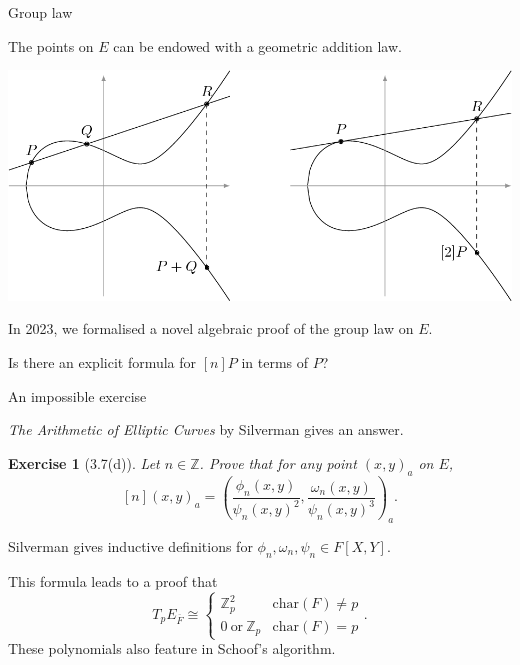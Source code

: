 \documentclass[10pt]{beamer}
\newtheorem{exercise}{Exercise}
\begin{document}
\begin{frame}[t]{Group law}

The points on $ E $ can be endowed with a geometric addition law.

\begin{center}
\includegraphics[width=\textwidth]{grouplaw.png}
\end{center}

\pause

In 2023, we formalised a novel algebraic proof of the group law on $ E $.

\pause

\vspace{0.5cm} Is there an explicit formula for $ [n]P $ in terms of $ P $?

\end{frame}

\begin{frame}[t]{An impossible exercise}

\emph{The Arithmetic of Elliptic Curves} by Silverman gives an answer.

\begin{exercise}[3.7(d)]
Let $ n \in \mathbb{Z} $. Prove that for any point $ (x, y)_a $ on $ E $,
$$ [n](x, y)_a = \left(\dfrac{\phi_n(x, y)}{\psi_n(x, y)^2}, \dfrac{\omega_n(x, y)}{\psi_n(x, y)^3}\right)_a. $$
\end{exercise}

Silverman gives inductive definitions for $ \phi_n, \omega_n, \psi_n \in F[X, Y] $.

\pause

\vspace{0.5cm} This formula leads to a proof that
$$ T_pE_{\overline{F}} \cong \begin{cases} \mathbb{Z}_p^2 & \mathrm{char}(F) \ne p \\ 0 \ \text{or} \ \mathbb{Z}_p & \mathrm{char}(F) = p \end{cases}. $$
These polynomials also feature in Schoof's algorithm.

\end{frame}
\end{document}
